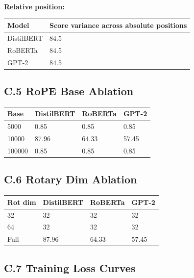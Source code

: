 \textbf{Relative position:}

\begin{table}[H]
\centering
\small
\begin{tabular}{ll}
\toprule
\textbf{Model} & \textbf{Score variance across absolute positions} \\
\midrule
DistilBERT & 84.5 \\
RoBERTa & 84.5 \\
GPT-2 & 84.5 \\
\bottomrule
\end{tabular}
\end{table}

\subsection{C.5 RoPE Base Ablation}

\begin{table}[H]
\centering
\small
\begin{tabular}{llll}
\toprule
\textbf{Base} & \textbf{DistilBERT} & \textbf{RoBERTa} & \textbf{GPT-2} \\
\midrule
5000 & 0.85 & 0.85 & 0.85 \\
10000 & 87.96 & 64.33 & 57.45 \\
100000 & 0.85 & 0.85 & 0.85 \\
\bottomrule
\end{tabular}
\end{table}

\subsection{C.6 Rotary Dim Ablation}

\begin{table}[H]
\centering
\small
\begin{tabular}{llll}
\toprule
\textbf{Rot dim} & \textbf{DistilBERT} & \textbf{RoBERTa} & \textbf{GPT-2} \\
\midrule
32 & 32 & 32 & 32 \\
64 & 32 & 32 & 32 \\
Full & 87.96 & 64.33 & 57.45 \\
\bottomrule
\end{tabular}
\end{table}

\subsection{C.7 Training Loss Curves}

